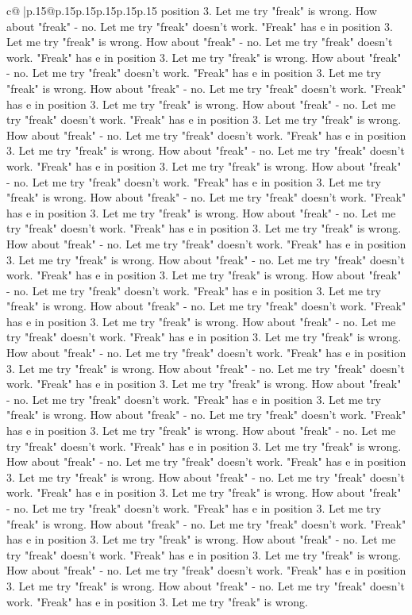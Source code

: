 \documentclass{article}
\begin{document}
{\begin{supertabular}{c@{$\;$}|p{.15\linewidth}@{}p{.15\linewidth}p{.15\linewidth}p{.15\linewidth}p{.15\linewidth}p{.15\linewidth}}
{{{position 3. Let me try "freak" is wrong. How about "freak" {-} no. Let me try "freak" doesn't work. "Freak" has e in position 3. Let me try "freak" is wrong. How about "freak" {-} no. Let me try "freak" doesn't work. "Freak" has e in position 3. Let me try "freak" is wrong. How about "freak" {-} no. Let me try "freak" doesn't work. "Freak" has e in position 3. Let me try "freak" is wrong. How about "freak" {-} no. Let me try "freak" doesn't work. "Freak" has e in position 3. Let me try "freak" is wrong. How about "freak" {-} no. Let me try "freak" doesn't work. "Freak" has e in position 3. Let me try "freak" is wrong. How about "freak" {-} no. Let me try "freak" doesn't work. "Freak" has e in position 3. Let me try "freak" is wrong. How about "freak" {-} no. Let me try "freak" doesn't work. "Freak" has e in position 3. Let me try "freak" is wrong. How about "freak" {-} no. Let me try "freak" doesn't work. "Freak" has e in position 3. Let me try "freak" is wrong. How about "freak" {-} no. Let me try "freak" doesn't work. "Freak" has e in position 3. Let me try "freak" is wrong. How about "freak" {-} no. Let me try "freak" doesn't work. "Freak" has e in position 3. Let me try "freak" is wrong. How about "freak" {-} no. Let me try "freak" doesn't work. "Freak" has e in position 3. Let me try "freak" is wrong. How about "freak" {-} no. Let me try "freak" doesn't work. "Freak" has e in position 3. Let me try "freak" is wrong. How about "freak" {-} no. Let me try "freak" doesn't work. "Freak" has e in position 3. Let me try "freak" is wrong. How about "freak" {-} no. Let me try "freak" doesn't work. "Freak" has e in position 3. Let me try "freak" is wrong. How about "freak" {-} no. Let me try "freak" doesn't work. "Freak" has e in position 3. Let me try "freak" is wrong. How about "freak" {-} no. Let me try "freak" doesn't work. "Freak" has e in position 3. Let me try "freak" is wrong. How about "freak" {-} no. Let me try "freak" doesn't work. "Freak" has e in position 3. Let me try "freak" is wrong. How about "freak" {-} no. Let me try "freak" doesn't work. "Freak" has e in position 3. Let me try "freak" is wrong. How about "freak" {-} no. Let me try "freak" doesn't work. "Freak" has e in position 3. Let me try "freak" is wrong. How about "freak" {-} no. Let me try "freak" doesn't work. "Freak" has e in position 3. Let me try "freak" is wrong. How about "freak" {-} no. Let me try "freak" doesn't work. "Freak" has e in position 3. Let me try "freak" is wrong. How about "freak" {-} no. Let me try "freak" doesn't work. "Freak" has e in position 3. Let me try "freak" is wrong. How about "freak" {-} no. Let me try "freak" doesn't work. "Freak" has e in position 3. Let me try "freak" is wrong. How about "freak" {-} no. Let me try "freak" doesn't work. "Freak" has e in position 3. Let me try "freak" is wrong. How about "freak" {-} no. Let me try "freak" doesn't work. "Freak" has e in position 3. Let me try "freak" is wrong. How about "freak" {-} no. Let me try "freak" doesn't work. "Freak" has e in position 3. Let me try "freak" is wrong. How about "freak" {-} no. Let me try "freak" doesn't work. "Freak" has e in position 3. Let me try "freak" is wrong. }}}
\end{supertabular}}
\end{document}
